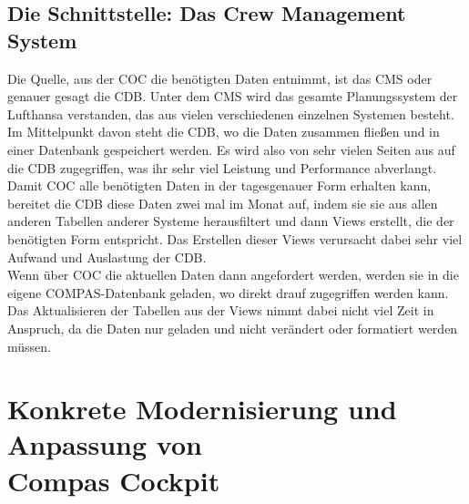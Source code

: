 \documentclass [12pt, a4paper, oneside, titlepage, ngerman]{article}
\begin{document}
\subsection {Die Schnittstelle: Das Crew Management System}
Die Quelle, aus der \ac{COC} die benötigten Daten entnimmt, ist das \ac{CMS} oder genauer gesagt die \ac{CDB}. Unter dem \ac{CMS} wird das gesamte Planungssystem der Lufthansa verstanden, das aus vielen verschiedenen einzelnen Systemen besteht. Im Mittelpunkt davon steht die \ac{CDB}, wo die Daten zusammen fließen und in einer Datenbank gespeichert werden. Es wird also von sehr vielen Seiten aus auf die \ac{CDB} zugegriffen, was ihr sehr viel Leistung und Performance abverlangt. \\
Damit \ac{COC} alle benötigten Daten in der tagesgenauer Form erhalten kann, bereitet die \ac{CDB} diese Daten zwei mal im Monat auf, indem sie sie aus allen anderen Tabellen anderer Systeme herausfiltert und dann Views erstellt, die der benötigten Form entspricht. Das Erstellen dieser Views verursacht dabei sehr viel Aufwand und Auslastung der \ac{CDB}.\\
Wenn über \ac{COC} die aktuellen Daten dann angefordert werden, werden sie in die eigene COMPAS-Datenbank geladen, wo direkt drauf zugegriffen werden kann. Das Aktualisieren der Tabellen aus der Views nimmt dabei nicht viel Zeit in Anspruch, da die Daten nur geladen und nicht verändert oder formatiert werden müssen.

\newpage
\section [Konkrete Modernisierung und Anpassung von COMPAS Cockpit]{Konkrete Modernisierung und Anpassung von \\ Compas Cockpit}
\end{document}
